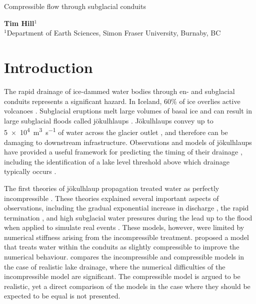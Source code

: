 \documentclass[11pt]{article}
\begin{document}
\begin{centering}{\LARGE Compressible flow through subglacial conduits}

\textbf{Tim Hill$^1$}\\
$^1$Department of Earth Sciences, Simon Fraser University, Burnaby, BC\\
\end{centering}






\vspace*{24pt}
\section{Introduction}
The rapid drainage of ice-dammed water bodies through en- and subglacial conduits represents a significant hazard. In Iceland, 60\% of ice overlies active volcanoes \citep{bjornsson2010}. Subglacial eruptions melt large volumes of basal ice and can result in large subglacial floods called j\"okulhlaups  \citep{bjornsson1975, bjornsson2010}. J\"okulhlaups convey up to \SI{5e4}{m^3.s^{-1}} of water across the glacier outlet \citep{bjornsson1993}, and therefore can be damaging to downstream infrastructure. Observations and models of j\"okulhlaups have provided a useful framework for predicting the timing of their drainage \citep{bjornsson2010}, including the identification of a lake level threshold above which drainage typically occurs \citep[Figure 5 of][]{bjornsson2010}.

The first theories of j\"okulhlaup propagation treated water as perfectly incompressible \citep{nye1976, spring1981, spring1982, clarke1982}. These theories explained several important aspects of observations, including the gradual exponential increase in discharge \citep[e.g.][]{clarke1982}, the rapid termination \citep{nye1976}, and high subglacial water pressures during the lead up to the flood when applied to simulate real events \citep{spring1981, spring1982, clarke1982}. These models, however, were limited by numerical stiffness arising from the incompressible treatment. \citet{clarke2003} proposed a model that treats water within the conduits as slightly compressible to improve the numerical behaviour. \citet{clarke2003} compares the incompressible and compressible models in the case of realistic lake drainage, where the numerical difficulties of the incompressible model are significant. The compressible model is argued to be realistic, yet a direct comparison of the models in the case where they should be expected to be equal is not presented.
\end{document}
